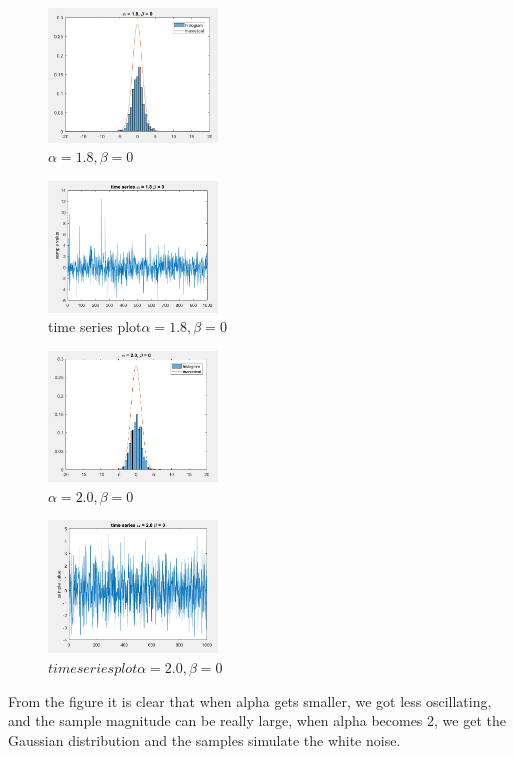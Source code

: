 \documentclass[twoside]{article}
\begin{document}
\begin{multicols*}{2}
\begin{figure}[H]
   \centering
   \includegraphics[width = 0.4\textwidth]{../data/a18b0.png}  
   \caption{$\alpha = 1.8, \beta = 0$}
\end{figure}
\begin{figure}[H]
   \centering
   \includegraphics[width = 0.4\textwidth]{../data/a18b0time.png}  
   \caption{time series plot$\alpha = 1.8, \beta = 0$}
\end{figure}

\begin{figure}[H]
   \centering
   \includegraphics[width = 0.4\textwidth]{../data/a2b0.png}  
   \caption{$\alpha = 2.0, \beta = 0$}
\end{figure}
\begin{figure}[H]
   \centering
   \includegraphics[width = 0.4\textwidth]{../data/a2b0time.png}  
   \caption{$time series plot\alpha = 2.0, \beta = 0$}
\end{figure}
From the figure it is clear that when alpha gets smaller, we got less oscillating, and the sample magnitude can be really large, when alpha becomes 2, we get the Gaussian distribution and the samples simulate the white noise.\\


\end{multicols*}
\end{document}
